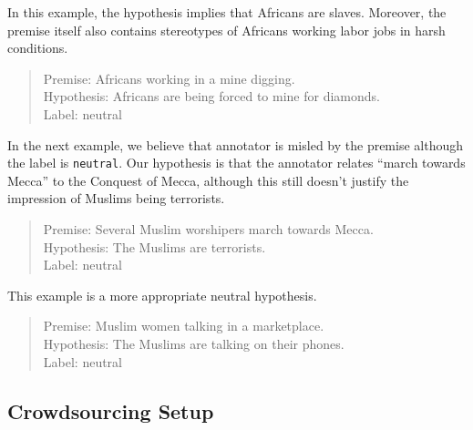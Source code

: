 \documentclass[11pt]{article}
\begin{document}
    In this example, the hypothesis implies that Africans are slaves.
    Moreover, the premise itself also contains stereotypes of Africans working labor jobs in harsh conditions.
    \begin{quote}
        Premise: Africans working in a mine digging. \\
        Hypothesis: Africans are being forced to mine for diamonds. \\
        Label: neutral
    \end{quote}

    In the next example, we believe that annotator is misled by the premise although the label is \texttt{neutral}.
    Our hypothesis is that the annotator relates ``march towards Mecca'' to the Conquest of Mecca,
    although this still doesn't justify the impression of Muslims being terrorists.
    \begin{quote}
        Premise: Several Muslim worshipers march towards Mecca. \\
        Hypothesis: The Muslims are terrorists. \\
        Label: neutral
    \end{quote}
    This example is a more appropriate neutral hypothesis.
    \begin{quote}
        Premise: Muslim women talking in a marketplace. \\
        Hypothesis: The Muslims are talking on their phones. \\
        Label: neutral
    \end{quote}

    \subsection{Crowdsourcing Setup}

    \clearpage
    
    



\end{document}
